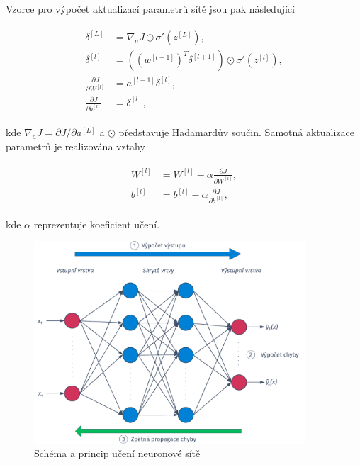 \noindent Vzorce pro výpočet aktualizací parametrů sítě jsou pak následující

\begin{align}
  \begin{split}
    \delta^{[L]} & = \nabla_{a} J \odot \sigma'\left(z^{[L]}\right), \\
    \delta^{[l]} & = \left(\left(w^{[l+1]}\right)^T \delta^{[l+1]}\right) \odot \sigma'\left(z^{[l]}\right), \\
    \frac{\partial J}{\partial W^{[l]}} & = a^{[l-1]}\delta^{[l]}, \\
    \frac{\partial J}{\partial b^{[l]}} & = \delta^{[l]},
  \end{split}
  \label{eq:asr:acoustic:dnn:bp}
\end{align}

\noindent kde $\nabla_a J = \partial J / \partial a^{[L]}$ a $\odot$ představuje Hadamardův součin. Samotná aktualizace parametrů je realizována vztahy

\begin{align}
  \begin{split}
    W^{[l]} & = W^{[l]} - \alpha \frac{\partial J}{\partial W^{[l]}}, \\
    b^{[l]} & = b^{[l]} - \alpha \frac{\partial J}{\partial b^{[l]}},
  \end{split}
  \label{eq:asr:acoustic:dnn:update}
\end{align}

\noindent kde $\alpha$ reprezentuje koeficient učení.

\begin{figure}[hbpt]
  \centering
  \includegraphics[width=0.9\textwidth]{./ch4-asr/img/dnn-training.pdf}
  \caption{Schéma a princip učení neuronové sítě}
  \label{fig:asr:acoustic:dnn:training}
\end{figure}

